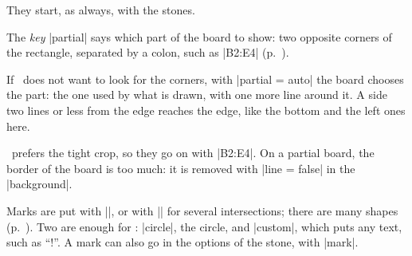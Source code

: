 \begin{goban}
They start, as always, with the stones.

\begin{codeexample}[width=5cm]
	\begin{goban}
	\end{goban}
\end{codeexample}

The \emph{key} |partial| says which part of the board to show: two opposite corners of the rectangle, separated by a colon, such as |B2:E4| (p.~\pageref{subsec:parcial}).

\begin{codeexample}[]
	\begin{goban}[partial = B2:E4]
		\stones[b]{C2,B3,C4}
		\stones[w]{D4,E3,D2,C3}
	\end{goban}
\end{codeexample}

If \karu\ does not want to look for the corners, with |partial = auto| the board chooses the part: the one used by what is drawn, with one more line around it. A side two lines or less from the edge reaches the edge, like the bottom and the left ones here.

\begin{codeexample}[]
	\begin{goban}[partial = auto]
	\end{goban}
\end{codeexample}

\karu\ prefers the tight crop, so they go on with |B2:E4|. On a partial board, the border of the board is too much: it is removed with |line = false| in the |background|.

\begin{codeexample}[]
	\begin{goban}[partial = B2:E4, background = {line = false}]
	\end{goban}
\end{codeexample}

Marks are put with |\mark|, or with |\marks| for several intersections; there are many shapes (p.~\pageref{sec:marcas}). Two are enough for \karu: |circle|, the circle, and |custom|, which puts any text, such as ``!''. A mark can also go in the options of the stone, with |mark|.

\begin{codeexample}[]
	\begin{goban}[partial = B2:E4, background = {line = false}]
		\stones[w] {D4,E3,D2}
		\mark[custom = {!}] {D3}
		\stone[w, mark = circle] {C3}
	\end{goban}
\end{codeexample}


\end{goban}
